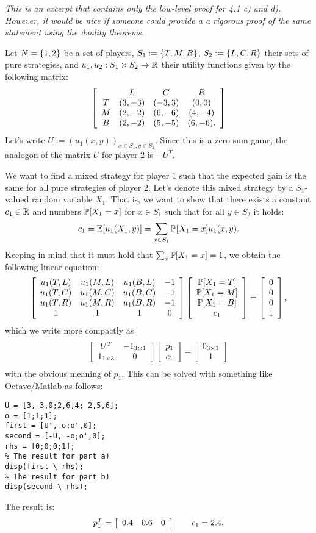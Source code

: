 \documentclass{scrartcl}
\newcommand{\exercise}[2]{\vspace{1em}\noindent{\bf Exercise #1 (#2)}}
\begin{document}
\hfill 
{\footnotesize }
\newline
{\footnotesize }

\noindent\hrulefill

\emph{
  This is an excerpt that contains only the low-level proof for 4.1 c) and d).
  However, it would be nice if someone could provide a a rigorous proof 
  of the same statement using the duality theorems.
}

\exercise{4.1}{Equalizing strategies}

Let $N=\set{1,2}$ be a set of players, $S_1 := \set{T,M,B}$, 
$S_2 := \set{L, C, R}$ their sets of pure strategies, and 
$u_1,u_2: S_1\times S_2 \to \Real$ their utility functions given by the 
following matrix:
\[
   \mat{cccc}{
       & L       & C       & R \\
    T  & (3, -3) & (-3, 3) & (0, 0) \\
    M  & (2, -2) & (6, -6) & (4, -4) \\
    B  & (2, -2) & (5, -5) & (6, -6).
   }
\]
Let's write $U := (u_1(x, y))_{x\in S_1, y \in S_2}$.
Since this is a zero-sum game, the analogon of the matrix $U$ for player $2$ 
is $-U^T$.

 We want to find a mixed strategy for player $1$ such
that the expected gain is the same for all pure strategies of player $2$. 
Let's denote this mixed strategy by a $S_1$-valued random variable $X_1$.
That is, we want to show that there exists a constant $c_1\in\Real$ and 
numbers $\P[X_1 = x]$ for $x\in S_1$ such that for all $y\in S_2$ it holds:
\[
  c_1 = \E[u_1(X_1,y)] = \sum_{x\in S_1} \P[X_1 = x] u_1(x, y).
\]
Keeping in mind that it must hold that $\sum_{x}\P[X_1 = x] = 1$, we obtain 
the following linear equation:
\[
  \mat{cccc}{
    u_1(T, L) & u_1(M, L) & u_1(B, L) & -1 \\
    u_1(T, C) & u_1(M, C) & u_1(B, C) & -1 \\
    u_1(T, R) & u_1(M, R) & u_1(B, R) & -1 \\
    1         & 1         & 1         & 0
  }
  \mat{c} {
    \P[X_1 = T] \\
    \P[X_1 = M] \\
    \P[X_1 = B] \\
    c_1
  }
  =
  \mat{c} {
    0 \\ 0 \\ 0 \\ 1
  },
\]
which we write more compactly as
\[
  \mat{cc}{
    U^T & -1_{3\times 1} \\
    1_{1\times 3} & 0
  }
  \mat{c}{p_1 \\ c_1} =
  \mat{c}{0_{3\times 1} \\ 1}
\]
with the obvious meaning of $p_1$. This can be solved with something like
Octave/Matlab as follows:
\begin{lstlisting}
U = [3,-3,0;2,6,4; 2,5,6];
o = [1;1;1];
first = [U',-o;o',0];
second = [-U, -o;o',0];
rhs = [0;0;0;1];
% The result for part a)
disp(first \ rhs);
% The result for part b)
disp(second \ rhs);
\end{lstlisting}
The result is:
\[
  p_1^T = \mat{ccc}{0.4 & 0.6 & 0} \qquad c_1 = 2.4.
\]
\end{document}
